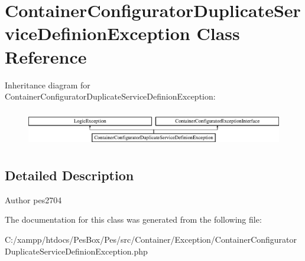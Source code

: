 \hypertarget{class_pes_1_1_container_1_1_exception_1_1_container_configurator_duplicate_service_definion_exception}{}\section{Container\+Configurator\+Duplicate\+Service\+Definion\+Exception Class Reference}
\label{class_pes_1_1_container_1_1_exception_1_1_container_configurator_duplicate_service_definion_exception}
Inheritance diagram for Container\+Configurator\+Duplicate\+Service\+Definion\+Exception\+:\begin{figure}[H]
\begin{center}
\leavevmode
\includegraphics[height=1.623188cm]{class_pes_1_1_container_1_1_exception_1_1_container_configurator_duplicate_service_definion_exception}
\end{center}
\end{figure}


\subsection{Detailed Description}
\begin{DoxyAuthor}{Author}
pes2704 
\end{DoxyAuthor}


The documentation for this class was generated from the following file\+:\begin{DoxyCompactItemize}
\item 
C\+:/xampp/htdocs/\+Pes\+Box/\+Pes/src/\+Container/\+Exception/Container\+Configurator\+Duplicate\+Service\+Definion\+Exception.\+php\end{DoxyCompactItemize}

